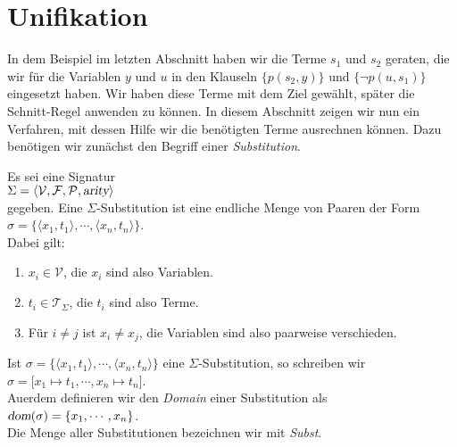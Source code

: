 \section{Unifikation}
In dem  Beispiel im letzten Abschnitt haben wir die Terme $s_1$ und $s_2$ geraten, die wir f\"{u}r die Variablen
$y$ und $u$ in den Klauseln $\big\{ p(s_2,y) \big\}$ und  $\big\{\neg p(u,s_1)\big\}$
eingesetzt haben.  Wir haben diese Terme mit dem Ziel gew\"{a}hlt, sp\"{a}ter die Schnitt-Regel
anwenden zu k\"{o}nnen.  In diesem Abschnitt zeigen wir nun ein Verfahren, mit dessen Hilfe
wir die ben\"{o}tigten Terme ausrechnen k\"{o}nnen.
Dazu ben\"{o}tigen wir zun\"{a}chst den Begriff einer \emph{Substitution}.
\begin{Definition}[Substitution]
    Es sei eine Signatur \\[0.2cm]
    \hspace*{1.3cm} $\Sigma = \langle \mathcal{V}, \mathcal{F}, \mathcal{P}, \textsl{arity} \rangle$ \\[0.2cm]
    gegeben.  Eine $\Sigma$-Substitution ist eine endliche Menge von Paaren der Form \\[0.2cm]
    \hspace*{1.3cm} $\sigma = \bigl\{ \langle x_1, t_1 \rangle, \cdots, \langle x_n, t_n \rangle \bigr\}$. \\[0.2cm]
    Dabei gilt:
    \begin{enumerate}
    \item $x_i \in \mathcal{V}$, die $x_i$ sind also Variablen.
    \item $t_i \in \mathcal{T}_\Sigma$, die $t_i$ sind also Terme.
    \item F\"{u}r $i\not=j$ ist $x_i \not= x_j$, die Variablen sind also paarweise verschieden.
    \end{enumerate}
    
    Ist $\sigma = \bigl\{ \langle x_1, t_1 \rangle, \cdots, \langle x_n, t_n \rangle \bigr\}$ eine
    $\Sigma$-Substitution, so schreiben wir  \\[0.2cm]
    \hspace*{1.3cm} $\sigma = \bigl[ x_1 \mapsto t_1, \cdots, x_n \mapsto t_n \bigr]$.  \\[0.2cm]
    Au\3erdem definieren wir den \emph{Domain} einer Substitution als \\[0.2cm]
    \hspace*{1.3cm} $\textsl{dom}(\sigma) = \{ x_1, \cdots, x_n\}$.
    \\[0.2cm]
    Die Menge aller Substitutionen bezeichnen wir mit \textsl{Subst}.
    \eox
\end{Definition}

